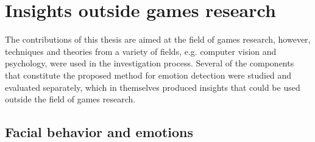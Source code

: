 



\section{Insights outside games research}

The contributions of this thesis are aimed at the field of games research, however, techniques and theories from a variety of fields, e.g. computer vision and psychology, were used in the investigation process. Several of the components that constitute the proposed method for emotion detection were studied and evaluated separately, which in themselves produced insights that could be used outside the field of games research.

\subsection{Facial behavior and emotions}

